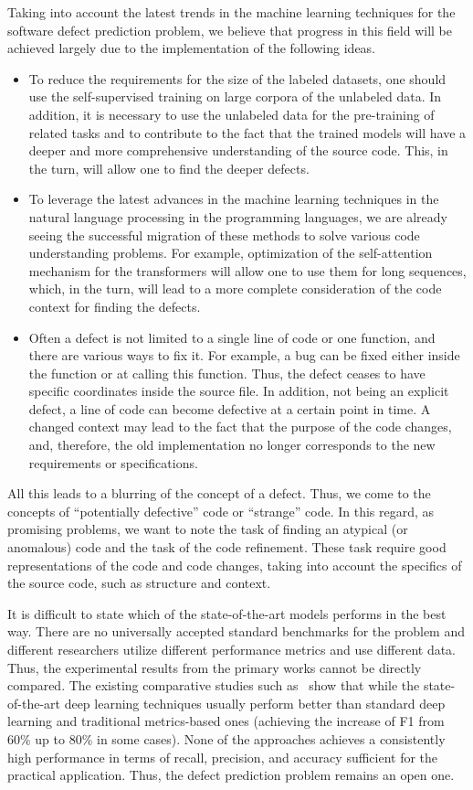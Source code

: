 \documentclass[mathematics,review,submit,moreauthors,pdftex]{Definitions/mdpi}
\begin{document}
Taking into account the latest trends in the machine learning techniques for the software defect prediction problem, we believe that progress in this field will be achieved largely due to the implementation of the following ideas.
\begin{itemize}
\item To reduce the requirements for the size of the labeled datasets, one should use the self-supervised training on large corpora of the unlabeled data. In addition, it is necessary to use the unlabeled data for the pre-training of related tasks and to contribute to the fact that the trained models will have a deeper and more comprehensive understanding of the source code. This, in the turn, will allow one to find the deeper defects.
\item To leverage the latest advances in the machine learning techniques in the natural language processing in the programming languages, we are already seeing the successful migration of these methods to solve various code understanding problems. For example, optimization of the self-attention mechanism for the transformers will allow one to use them for long sequences, which, in the turn, will lead to a more complete consideration of the code context for finding the defects.
\item Often a defect is not limited to a single line of code or one function, and there are various ways to fix it. For example, a bug can be fixed either inside the function or at calling this function. Thus, the defect ceases to have specific coordinates inside the source file. In addition, not being an explicit defect, a line of code can become defective at a certain point in time. A changed context may lead to the fact that the purpose of the code changes, and, therefore, the old implementation no longer corresponds to the new requirements or specifications. 
\end{itemize}

All this leads to a blurring of the concept of a defect. Thus, we come to the concepts of ``potentially defective'' code or ``strange'' code. In this regard, as promising problems, we want to note the task of finding an atypical (or anomalous) code and the task of the code refinement. These task require good representations of the code and code changes, taking into account the specifics of the source code, such as structure and context.

It is difficult to state which of the state-of-the-art models performs in the best way. There are no universally accepted standard benchmarks for the problem and different researchers utilize different performance metrics and use different data. Thus, the experimental results from the primary works cannot be directly compared. The existing comparative studies such as~\cite{Herbold2018benchmark} show that while the state-of-the-art deep learning techniques usually perform better than standard deep learning and traditional metrics-based ones (achieving the increase of F1 from 60\% up to 80\% in some cases). None of the approaches achieves a consistently high performance in terms of recall, precision, and accuracy sufficient for the practical application. Thus, the defect prediction problem remains an open one.
\end{document}
